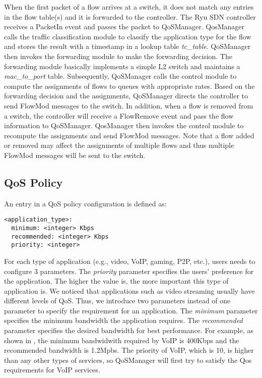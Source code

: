 When the first packet of a flow arrives at a switch, it does not match any entries in the flow table(s) and
it is forwarded to the controller. The Ryu SDN controller receives a \textsf{PacketIn} event and passes the
packet to QoSManager. QosManager calls the traffic classification module to classify the application type for
the flow and stores the result with a timestamp in a lookup table \emph{tc\_table}. QoSManager then invokes
the forwarding module to make the forwarding decision. The forwarding module basically implements a simple L2
switch and maintains a \emph{mac\_to\_port} table. Subsequently, QoSManager calls the control module to compute
the assignments of flows to queues with appropriate rates. Based on the forwarding decision and the assignments,
QoSManager directs the controller to send \textsf{FlowMod} messages to the switch. In addition, when a flow is
removed from a switch, the controller will receive a \textsf{FlowRemove} event and pass the flow information to
QoSManager. QosManager then invokes the control module to recompute the assignments and send \textsf{FlowMod}
messages. Note that a flow added or removed may affect the assignments of multiple flows and thus multiple
\textsf{FlowMod} messages will be sent to the switch. 

\subsection{QoS Policy}
\label{sect:qosPolicy}

An entry in a QoS policy configuration is defined as:

\begin{lstlisting}[basicstyle=\sffamily]
<application_type>:
  minimum: <integer> Kbps
  recommended: <integer> Kbps
  priority: <integer>
\end{lstlisting}

For each type of application (e.g., video, VoIP, gaming, P2P, etc.), users needs to configure 3 parameters. The \emph{priority}
parameter specifies the users' preference for the application. The higher the value is, the more important this type of
application is. We noticed that applications such as video streaming usually have different levels of QoS. Thus, we introduce two
parameters instead of one parameter to specify the requirement for an application. The \emph{minimum} parameter specifies
the minimum bandwidth the application requires. The \emph{recommended} parameter specifies the desired bandwidth for best
performance. For example, as shown in , the minimum bandwidwith required by VoIP is 400Kbps and the recommended
bandwidth is 1.2Mpbs. The priority of VoIP, which is 10, is higher than any other types of services, so QoSManager will first try to
satisfy the Qos requirements for VoIP services.


